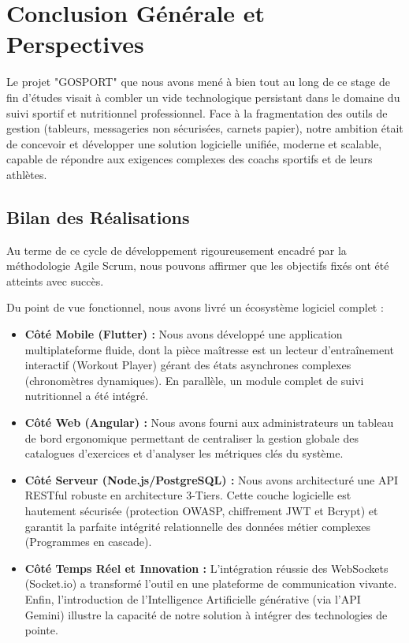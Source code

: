 \chapter*{Conclusion Générale et Perspectives}

Le projet "GOSPORT" que nous avons mené à bien tout au long de ce stage de fin d'études visait à combler un vide technologique persistant dans le domaine du suivi sportif et nutritionnel professionnel. Face à la fragmentation des outils de gestion (tableurs, messageries non sécurisées, carnets papier), notre ambition était de concevoir et développer une solution logicielle unifiée, moderne et scalable, capable de répondre aux exigences complexes des coachs sportifs et de leurs athlètes.

\section*{Bilan des Réalisations}
Au terme de ce cycle de développement rigoureusement encadré par la méthodologie Agile Scrum, nous pouvons affirmer que les objectifs fixés ont été atteints avec succès. 

Du point de vue fonctionnel, nous avons livré un écosystème logiciel complet :
\begin{itemize}
    \item \textbf{Côté Mobile (Flutter) :} Nous avons développé une application multiplateforme fluide, dont la pièce maîtresse est un lecteur d'entraînement interactif (Workout Player) gérant des états asynchrones complexes (chronomètres dynamiques). En parallèle, un module complet de suivi nutritionnel a été intégré.
    \item \textbf{Côté Web (Angular) :} Nous avons fourni aux administrateurs un tableau de bord ergonomique permettant de centraliser la gestion globale des catalogues d'exercices et d'analyser les métriques clés du système.
    \item \textbf{Côté Serveur (Node.js/PostgreSQL) :} Nous avons architecturé une API RESTful robuste en architecture 3-Tiers. Cette couche logicielle est hautement sécurisée (protection OWASP, chiffrement JWT et Bcrypt) et garantit la parfaite intégrité relationnelle des données métier complexes (Programmes en cascade).
    \item \textbf{Côté Temps Réel et Innovation :} L'intégration réussie des WebSockets (Socket.io) a transformé l'outil en une plateforme de communication vivante. Enfin, l'introduction de l'Intelligence Artificielle générative (via l'API Gemini) illustre la capacité de notre solution à intégrer des technologies de pointe.
\end{itemize}

